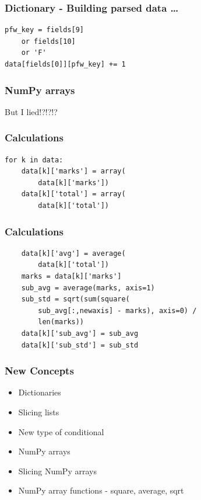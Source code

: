 \documentclass[14pt,compress]{beamer}
\begin{document}
\begin{frame}[fragile]
  \frametitle{Dictionary - Building parsed data \ldots}
  \begin{lstlisting}
pfw_key = fields[9]
    or fields[10]
    or 'F'
data[fields[0]][pfw_key] += 1
  \end{lstlisting}
\end{frame}

\begin{frame}[fragile]
  \frametitle{NumPy arrays}
  \centerline{\alert{But I lied!?!?!?}}
\end{frame}

\begin{frame}[fragile]
  \frametitle{Calculations}
  \begin{lstlisting}
for k in data:
    data[k]['marks'] = array(
        data[k]['marks'])
    data[k]['total'] = array(
        data[k]['total'])
  \end{lstlisting}
\end{frame}

\begin{frame}[fragile]
  \frametitle{Calculations}
  \small
  \begin{lstlisting}
    data[k]['avg'] = average(
        data[k]['total'])
    marks = data[k]['marks']
    sub_avg = average(marks, axis=1)
    sub_std = sqrt(sum(square(
        sub_avg[:,newaxis] - marks), axis=0) /
        len(marks))
    data[k]['sub_avg'] = sub_avg
    data[k]['sub_std'] = sub_std
  \end{lstlisting}
\end{frame}

\begin{frame}[fragile]
  \frametitle{New Concepts}
  \begin{itemize}
   \item Dictionaries
   \item Slicing lists
   \item New type of conditional
   \item NumPy arrays
   \item Slicing NumPy arrays
   \item NumPy array functions - square, average, sqrt
  \end{itemize}
\end{frame}
\end{document}
